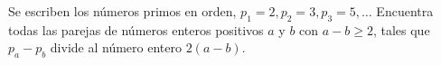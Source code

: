 Se escriben los números primos en orden, $p_1 = 2, p_2 = 3, p_3 = 5,\dots$
Encuentra todas las parejas de números enteros positivos $a$ y $b$ con $a − b \geq 2$, tales que
$p_a − p_b$ divide al número entero $2(a − b)$.